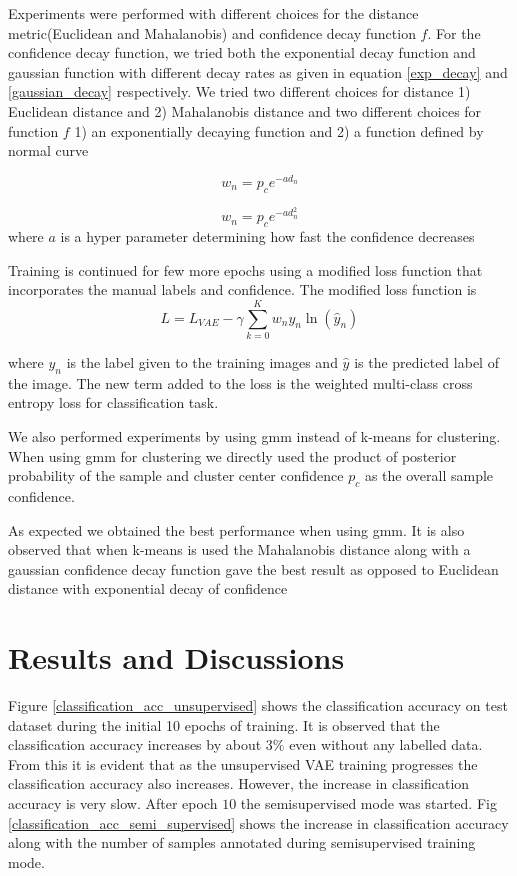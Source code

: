 \documentclass[runningheads]{llncs}
\begin{document}
Experiments were performed with different choices for the distance metric(Euclidean and Mahalanobis) and confidence decay function $f$.
For the confidence decay function, we tried both the exponential decay function and gaussian function with different decay rates as given in equation \ref{exp_decay} and \ref{gaussian_decay} respectively.
We tried two different choices for distance  1) Euclidean distance and 2) Mahalanobis distance and two different choices for function $f$ 1) an exponentially decaying function and  2) a function defined by normal curve

\begin{equation}
    w_n = p_ce^{-a d_n}
    \label{exp_decay}
\end{equation}


\begin{equation}
    w_n = p_ce^{-a d_n^2}
    \label{gaussian_decay}
\end{equation}
where $a$ is a hyper parameter determining how fast the confidence decreases


Training is continued for  few more epochs using a modified loss function that incorporates the manual labels and confidence.
The modified loss function is
\begin{equation} \label{semi_supervised_loss}
L = L_{VAE}  - \gamma \sum_{k=0}^{K}w_{n}y_{n}\ln(\hat{y}_{n})
\end{equation}

where $y_n$ is the label given to the training images and $\hat{y}$ is the predicted label of the image.
The new term added to the loss is the weighted multi-class cross entropy loss for classification task.


We also performed experiments by using gmm instead of k-means for clustering.
When using gmm for clustering we directly used the product of posterior probability of the sample and cluster center confidence $p_c$ as the overall sample confidence.

As expected we obtained the best performance when using gmm.
It is also observed that when k-means is used the Mahalanobis distance along with a gaussian confidence decay function gave the best result as opposed to Euclidean distance with exponential decay of confidence


\section{Results and Discussions}
Figure \ref{classification_acc_unsupervised} shows the  classification accuracy on test dataset during the initial 10 epochs of training.
It is observed that the classification accuracy increases by about $3\%$ even without any labelled data.
From this it is evident that as the unsupervised VAE training progresses the classification accuracy also increases.
However, the increase in classification accuracy is very slow.
After epoch $10$ the semisupervised mode was started. Fig \ref{classification_acc_semi_supervised}  shows the increase in classification accuracy along with the number of samples annotated  during semisupervised training mode.
\end{document}
